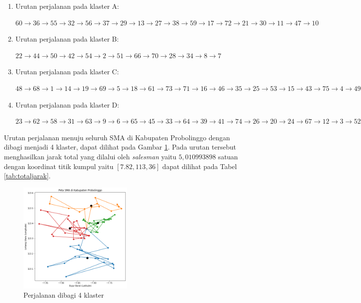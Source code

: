 \begin{enumerate}

\item Urutan perjalanan pada klaster A:

$60\rightarrow36\rightarrow55\rightarrow32\rightarrow56\rightarrow37\rightarrow29\rightarrow13\rightarrow27\rightarrow38\rightarrow59\rightarrow17\rightarrow72\rightarrow21\rightarrow30\rightarrow11\rightarrow47\rightarrow10$

\item Urutan perjalanan pada klaster B:

$22\rightarrow44\rightarrow50\rightarrow42\rightarrow54\rightarrow2\rightarrow51\rightarrow66\rightarrow70\rightarrow28\rightarrow34\rightarrow8\rightarrow7$

\item Urutan perjalanan pada klaster C:

$48\rightarrow68\rightarrow1\rightarrow14\rightarrow19\rightarrow69\rightarrow5\rightarrow18\rightarrow61\rightarrow73\rightarrow71\rightarrow16\rightarrow46\rightarrow35\rightarrow25\rightarrow53\rightarrow15\rightarrow43\rightarrow75\rightarrow4\rightarrow49\rightarrow40\rightarrow57$

\item Urutan perjalanan pada klaster D:

$23\rightarrow62\rightarrow58\rightarrow31\rightarrow63\rightarrow9\rightarrow6\rightarrow65\rightarrow45\rightarrow33\rightarrow64\rightarrow39\rightarrow41\rightarrow74\rightarrow26\rightarrow20\rightarrow24\rightarrow67\rightarrow12\rightarrow3\rightarrow52$

\end{enumerate}

Urutan perjalanan menuju seluruh SMA di Kabupaten Probolinggo dengan dibagi menjadi 4 klaster, dapat dilihat pada Gambar \ref{fig:hasil_mtsp4}. Pada urutan tersebut menghasilkan jarak total yang dilalui oleh \textit{salesman} yaitu $5,010993898$ satuan dengan koordinat titik kumpul yaitu $[7.82, 113,36]$ dapat dilihat pada Tabel \ref{tab:totaljarak}.


\begin{figure}[H]
\centering
\includegraphics[width=0.5\textwidth]{Gambar/hasil_mtsp/4}
\caption{Perjalanan dibagi 4 klaster}
\label{fig:hasil_mtsp4}
\end{figure}

